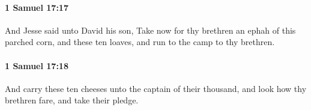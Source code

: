 		\paragraph{1 Samuel 17:17} %
			\label{1SAMUEL-17-17}

			And Jesse said unto David his son, Take now for thy brethren an ephah of this parched corn, and these ten loaves, and run to the camp to thy brethren.


		\paragraph{1 Samuel 17:18} %
			\label{1SAMUEL-17-18}

			And carry these ten cheeses unto the captain of their thousand, and look how thy brethren fare, and take their pledge.


